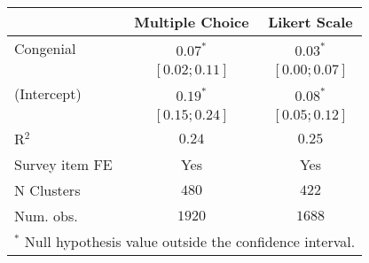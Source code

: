 \begin{table}
\begin{center}
  \begin{tabular}{l c c}
\hline
 & Multiple Choice & Likert Scale \\
\hline
Congenial      & $0.07^{*}$      & $0.03^{*}$      \\
               & $ [0.02; 0.11]$ & $ [0.00; 0.07]$ \\
(Intercept)    & $0.19^{*}$      & $0.08^{*}$      \\
               & $ [0.15; 0.24]$ & $ [0.05; 0.12]$ \\
\hline
R$^2$          & $0.24$          & $0.25$          \\
Survey item FE & Yes             & Yes             \\
N Clusters     & $480$           & $422$           \\
Num. obs.      & $1920$          & $1688$          \\
\hline
\multicolumn{3}{l}{\scriptsize{$^*$ Null hypothesis value outside the confidence interval.}}
  \end{tabular}
\end{center}
\end{table}